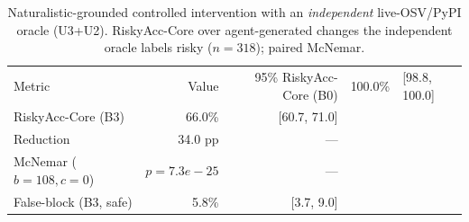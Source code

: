 \begin{table}[t]\centering
\caption{Naturalistic-grounded controlled intervention with an \emph{independent} live-OSV/PyPI oracle (U3+U2). RiskyAcc-Core over agent-generated changes the independent oracle labels risky ($n=318$); paired McNemar.}
\label{tab:e1a-indep}
\begin{tabular}{lrr}
\toprule
Metric & Value & 95\%%
\midrule
RiskyAcc-Core (B0) & 100.0\% & [98.8, 100.0] \\
RiskyAcc-Core (B3) & 66.0\% & [60.7, 71.0] \\
Reduction & 34.0 pp & --- \\
McNemar ($b{=}108,c{=}0$) & $p{=}7.3e-25$ & --- \\
False-block (B3, safe) & 5.8\% & [3.7, 9.0] \\
\bottomrule
\end{tabular}
\end{table}
